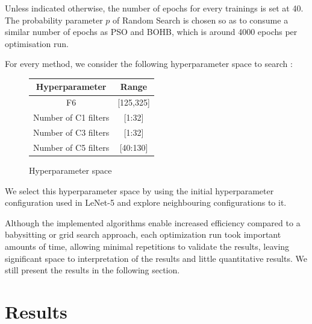 \documentclass[a4 paper,11pt,2]{article}
\begin{document}
Unless indicated otherwise, the number of epochs for every trainings is set at 40. The probability parameter $p$ of Random Search is chosen so as to consume a similar number of epochs as PSO and BOHB, which is around 4000 epochs per optimisation run.

For every method, we consider the following hyperparameter space to search :

\begin{figure}[h]
\centering
\begin{tabular}{|c|c|}
\hline
Hyperparameter & Range \\
\hline
F6 & [125,325]\\
\hline
Number of C1 filters & [1:32] \\
\hline
Number of C3 filters & [1:32] \\
\hline
Number of C5 filters & [40:130] \\
\hline
\end{tabular}
\label{tab:hpspace}
\caption{Hyperparameter space}
\end{figure}

We select this hyperparameter space by using the initial hyperparameter configuration used in LeNet-5 and explore neighbouring configurations to it.

Although the implemented algorithms enable increased efficiency compared to a babysitting or grid search approach, each optimization run took important amounts of time, allowing minimal repetitions to validate the results, leaving significant space to interpretation of the results and little quantitative results. We still present the results in the following section.

\section{Results}
\end{document}
